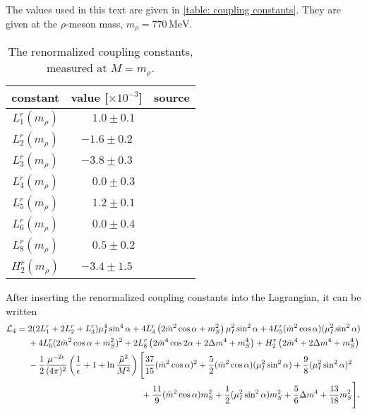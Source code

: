 The values used in this text are given in \autoref{table: coupling constants}.
They are given at the $\rho$-meson mass, $m_\rho = 770\, \text{MeV}$.
%
\begin{table}
    \centering
    \def\arraystretch{1.2}
    \caption{The renormalized coupling constants, measured at $M = m_\rho$.}
    \label{table: coupling constants}
    \begin{tabular}{c c c}
        \hline \hline
        constant & value [$\times 10^{-3}$] & source \\
        \hline
        $L_1^r(m_\rho)$ & $\phantom{-}1.0 \pm 0.1 $ & \autocite{bijnensMesonicLowEnergyConstants2014} \\
        $L_2^r(m_\rho)$ & $-1.6 \pm 0.2 $ & \autocite{bijnensMesonicLowEnergyConstants2014} \\
        $L_3^r(m_\rho)$ & $-3.8 \pm 0.3 $ & \autocite{bijnensMesonicLowEnergyConstants2014} \\
        $L_4^r(m_\rho)$ & $\phantom{-}0.0 \pm 0.3 $ & \autocite{bijnensMesonicLowEnergyConstants2014} \\
        $L_5^r(m_\rho)$ & $\phantom{-}1.2 \pm 0.1 $ & \autocite{bijnensMesonicLowEnergyConstants2014} \\
        $L_6^r(m_\rho)$ & $\phantom{-}0.0 \pm 0.4 $ & \autocite{bijnensMesonicLowEnergyConstants2014} \\
        $L_8^r(m_\rho)$ & $\phantom{-}0.5 \pm 0.2 $ & \autocite{bijnensMesonicLowEnergyConstants2014} \\
        $H_2^r(m_\rho)$ & $-3.4 \pm 1.5 $ & \autocite{jaminFlavoursymmetryBreakingQuark2002} 
    \end{tabular}
\end{table}
%
After inserting the renormalized coupling constants into the Lagrangian, it can be written
%
\begin{align}
    \label{nlo static lagrangian}
    \nonumber
    \mathcal{L}_4
    = {}&
    2(2L_1^r + 2L_2^r + L_3^r) \mu_I^4 \sin^4\alpha
    + 4  L_4^r \left( 2 \bar m^2 \cos\alpha + m_S^2 \right) \mu_I^2\sin^2\alpha
    + 4 L_5^r (\bar m^2 \cos\alpha) (\mu_I^2  \sin^2 \alpha )
    \\ \nonumber
    & 
    + 4 L_6^r (2\bar m^2\cos\alpha + m_S^2)^2
    + 2 L_8^r \left(2 \bar m^4 \cos2\alpha + 2 \Delta m^4 + m_S^4\right)
    + H_2^r \left(2\bar m^4 + 2\Delta m^4 + m_S^4 \right)
    \\ \nonumber
    &
    - \frac{1}{2}\frac{\mu^{-2\epsilon}}{(4\pi)^2}
    \left( \frac{1}{\epsilon} + 1 + \ln\frac{\tilde \mu^2}{M^2} \right)
    \Bigg[
        \frac{37}{15} (\bar m^2 \cos\alpha)^2
        +\frac{5}{2} (\bar m^2 \cos\alpha)(\mu_I^2\sin^2\alpha)
        +\frac{9}{8} (\mu_I^2\sin^2\alpha)^2 \\
        &
        \quad\quad\quad\quad\quad\quad\quad\quad\quad\quad\quad\quad\quad
        +\frac{11}{9} (\bar m^2 \cos\alpha)m_S^2
        +\frac{1}{2} (\mu_I^2\sin^2\alpha)m_S^2
        +\frac{5}{6} \Delta m^4
        +\frac{13}{18} m_S^2
    \Bigg].
\end{align}




